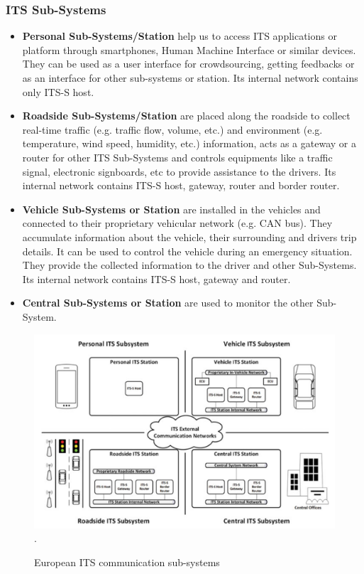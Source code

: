 \subsubsection{ITS Sub-Systems}

\begin{itemize}
    \item \textbf{Personal Sub-Systems/Station} help us to access ITS applications or platform through smartphones, Human Machine Interface or similar devices. They can be used as a user interface for crowdsourcing, getting feedbacks or as an interface for other sub-systems or station. Its internal network contains only ITS-S host.
    \item \textbf{Roadside Sub-Systems/Station} are placed along the roadside to collect real-time traffic (e.g. traffic flow, volume, etc.) and environment (e.g. temperature, wind speed, humidity, etc.) information, acts as a gateway or a router for other ITS Sub-Systems and controls equipments like a traffic signal, electronic signboards, etc to provide assistance to the drivers. Its internal network contains ITS-S host, gateway, router and border router. 
    \item \textbf{Vehicle Sub-Systems or Station} are installed in the vehicles and connected to their proprietary vehicular network (e.g. CAN bus). They accumulate information about the vehicle, their surrounding and drivers trip details. It can be used to control the vehicle during an emergency situation. They provide the collected information to the driver and other Sub-Systems. Its internal network contains ITS-S host, gateway and router.
    \item \textbf{Central Sub-Systems or Station} are used to monitor the other Sub-System.
    
\end{itemize}

\begin{figure}[h!]
    \centering
    \includegraphics[width=12cm]{Framework/Images/ITSArc.png}.
    \caption{European ITS communication sub-systems}
    \label{cits---s}
\end{figure}
